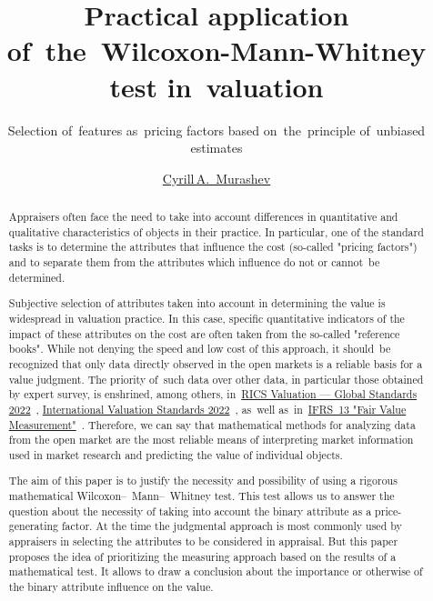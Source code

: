 \documentclass[]{scrreprt}
\title{Practical application of~the~Wilcoxon-Mann-Whitney test in~valuation}
\subtitle{Selection of~features as~pricing factors based on~the~principle of~unbiased estimates}
\author{\href{https://www.facebook.com/groups/1977067932456703}{Cyrill\,A.~Murashev}}
\begin{document}
\maketitle
%
%	
\begin{abstract}
	Appraisers often face the need to take into account differences in quantitative and qualitative characteristics of objects in their practice. In particular, one of the standard tasks is to determine the attributes that influence the cost (so-called "pricing factors") and to separate them from the attributes which influence do not or cannot~be determined.
	
	Subjective selection of attributes taken into account in determining the value is widespread in valuation practice. In this case, specific quantitative indicators of the impact of these attributes on the cost are often taken from the so-called "reference books". While not denying the speed and low cost of this approach, it should~be recognized that only data directly observed in the open markets is a reliable basis for a value judgment. The priority of~such data over other data, in particular those obtained by expert survey, is enshrined, among others, in~\href{https://www.rics.org/uk/upholding-professional-standards/sector-standards/valuation/red-book/red-book-global/}{RICS Valuation --- Global Standards 2022}~\cite{RVGS-2022}, \href{https://www.rics.org/uk/upholding-professional-standards/sector-standards/valuation/red-book/international-valuation-standards/}{International Valuation Standards 2022}~\cite{IVS-2022}, as~well as~in~\href{http://eifrs.ifrs.org/eifrs/bnstandards/en/IFRS13.pdf}{IFRS~13 "Fair Value Measurement"}~\cite{IFRS-13}. Therefore, we can say that mathematical methods for analyzing data from the open market are the most reliable means of interpreting market information used in market research and predicting the value of individual objects.
	
	The aim of this paper is to justify the necessity and possibility of using a rigorous mathematical Wilcoxon--~Mann--~Whitney test. This test allows us to answer the question about the necessity of taking into account the binary attribute as a price-generating factor. At the time the judgmental approach is most commonly used by appraisers in selecting the attributes to be considered in appraisal. But this paper proposes the idea of prioritizing the measuring approach based on the results of a mathematical test. It allows to draw a conclusion about the importance or otherwise of the binary attribute influence on the value.
	

\end{abstract}
\end{document}
